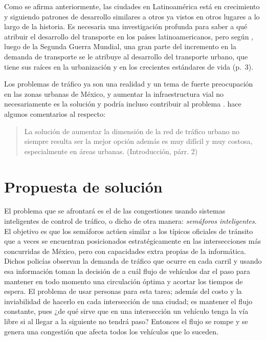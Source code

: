 Como se afirma anteriormente, las ciudades en Latinoamérica está en
crecimiento y siguiendo patrones de desarrollo similares a otros ya
vistos en otros lugares a lo largo de la historia. Es necesaria una
investigación profunda para saber a qué atribuir el desarrollo del
transporte en los países latinoamericanos, pero según
\textcite{Patriksson2012}, luego de la Segunda Guerra Mundial, una gran
parte del incremento en la demanda de transporte se le atribuye al
desarrollo del transporte urbano, que tiene sus raíces en la
urbanización y en los crecientes estándares de vida (p.~3).

Los problemas de tráfico ya son una realidad y un tema de fuerte
preocupación en las zonas urbanas de México, y aumentar la
infraestructura vial no necesariamente es la solución y podría incluso
contribuir al problema \parencite[124-126]{Galindo2006}.
\textcite{JoelTrejo2006} hace algunos comentarios al respecto:

\begin{quote}
La solución de aumentar la dimensión de la red de tráfico urbano no
siempre resulta ser la mejor opción además es muy difícil y muy costosa,
especialmente en áreas urbanas. (Introducción, párr. 2)
\end{quote}

\hypertarget{propuesta-de-soluciuxf3n}{%
\section{Propuesta de solución}\label{propuesta-de-soluciuxf3n}}

El problema que se afrontará es el de las congestiones usando sistemas
inteligentes de control de tráfico, o dicho de otra manera:
\emph{semáforos inteligentes}. El objetivo es que los semáforos actúen
similar a los típicos oficiales de tránsito que a veces se encuentran
posicionados estratégicamente en las intersecciones más concurridas de
México, pero con capacidades extra propias de la informática. Dichos
policías observan la demanda de tráfico que ocurre en cada carril y
usando esa información toman la decisión de a cuál flujo de vehículos
dar el paso para mantener en todo momento una circulación óptima y
acortar los tiempos de espera. El problema de usar personas para esta
tarea; además del costo y la inviabilidad de hacerlo en cada
intersección de una ciudad; es mantener el flujo constante, pues ¿de qué
sirve que en una intersección un vehículo tenga la vía libre si al
llegar a la siguiente no tendrá paso? Entonces el flujo se rompe y se
genera una congestión que afecta todos los vehículos que lo suceden.

